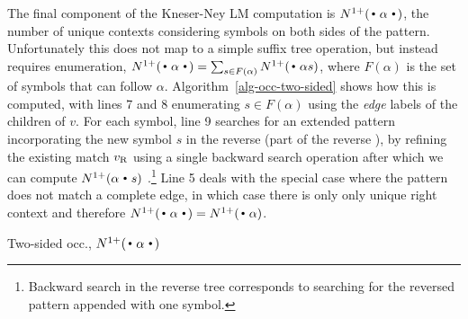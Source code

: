 The final component of the Kneser-Ney LM computation is
$\nlplus{\dotpatdot}$, the number of unique contexts considering
symbols on both sides of the pattern. 
Unfortunately this does not map to a simple suffix tree operation,
but instead requires enumeration,
$\nlplus{\dotpatdot} = \sum_{s \in F(\alpha)} \nlplus{\dotpat s}$, 
where $F(\alpha)$ is the set of symbols that can follow $\alpha$.
Algorithm~\ref{alg-occ-two-sided} shows how this is computed, with lines 7 and 8 enumerating $s \in F(\alpha)$ using the \emph{edge} labels of the children of $v$.
For each symbol, line 9 searches for an extended pattern incorporating
the new symbol $s$ in the reverse \CSA (part of the reverse \CST), by
refining the existing match $v_{\text{R}}$ using a single backward search
operation after which we can compute $\nlplus{\patdot
  s}$ .\footnote{Backward search in the reverse tree corresponds to
  searching for the reversed pattern appended with one symbol.}
Line 5 deals with the special case where the pattern does not match a complete edge, in which case there is only only unique right context and therefore $\nlplus{\dotpatdot} = \nlplus{\dotpat}$.

\begin{algorithm}[t]
  \caption{Two-sided occ., $\nlplus{\dotpatdot}$ 
    \label{alg:n1plusfb}}
\footnotesize
  \begin{algorithmic}[1]
        \Else
           \For{$\chf \gets \children{\tf}{\nf}$} 
            \EndFor
        \EndIf
      \State {}
    \EndFunction
  \end{algorithmic}
\label{alg-occ-two-sided}
\end{algorithm}

